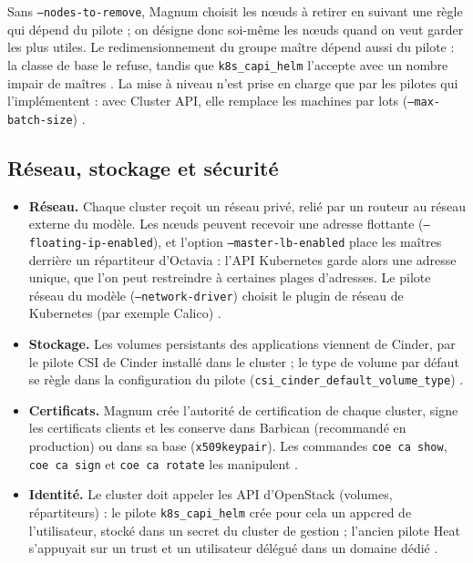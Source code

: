 Sans \texttt{--nodes-to-remove}, Magnum choisit les nœuds à retirer en suivant une règle qui dépend du pilote ; on désigne
donc soi-même les nœuds quand on veut garder les plus utiles. Le redimensionnement du groupe maître dépend aussi du pilote :
la classe de base le refuse, tandis que \texttt{k8s\_capi\_helm} l'accepte avec un nombre impair de maîtres
\parencite{magnum-source,magnum-capi-helm-source}. La mise à niveau n'est prise en charge que par les pilotes qui l'implémentent : avec Cluster API,
elle remplace les machines par lots (\texttt{--max-batch-size}) \parencite{magnum-capi-helm-user}.

\subsection{Réseau, stockage et sécurité}\label{sec:ma-reseau}

\begin{itemize}
  \item \textbf{Réseau.} Chaque cluster reçoit un réseau privé, relié par un routeur au réseau externe du modèle. Les nœuds
        peuvent recevoir une adresse flottante (\texttt{--floating-ip-enabled}), et l'option \texttt{--master-lb-enabled} place
        les maîtres derrière un répartiteur d'Octavia : l'API Kubernetes garde alors une adresse unique, que l'on peut
        restreindre à certaines plages d'adresses. Le pilote réseau du modèle (\texttt{--network-driver}) choisit le
        plugin de réseau de Kubernetes (par exemple Calico) \parencite{magnum-user,magnum-capi-helm-config}.
  \item \textbf{Stockage.} Les volumes persistants des applications viennent de Cinder, par le pilote CSI de Cinder installé
        dans le cluster ; le type de volume par défaut se règle dans la configuration du pilote
        (\texttt{csi\_cinder\_default\_volume\_type}) \parencite{magnum-user,magnum-capi-helm-config}.
  \item \textbf{Certificats.} Magnum crée l'autorité de certification de chaque cluster, signe les certificats clients et les
        conserve dans Barbican (recommandé en production) ou dans sa base (\texttt{x509keypair}). Les commandes
        \texttt{coe ca show}, \texttt{coe ca sign} et \texttt{coe ca rotate} les manipulent \parencite{magnum-install,magnum-user}.
  \item \textbf{Identité.} Le cluster doit appeler les API d'OpenStack (volumes, répartiteurs) : le pilote
        \texttt{k8s\_capi\_helm} crée pour cela un \gls{appcred} de l'utilisateur, stocké dans un secret du cluster de gestion ;
        l'ancien pilote Heat s'appuyait sur un \gls{trust} et un utilisateur délégué dans un domaine dédié
        \parencite{magnum-capi-helm-source,magnum-install}.
\end{itemize}

